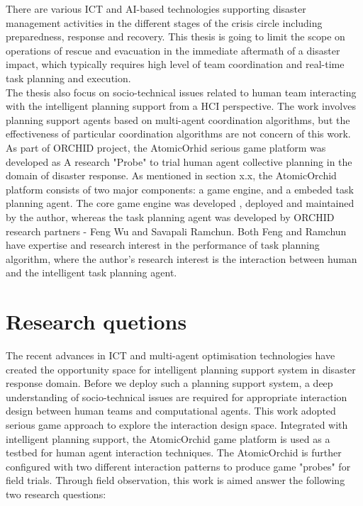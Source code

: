 There are various ICT and AI-based technologies supporting disaster management activities in the different stages of the crisis circle including preparedness, response and recovery. This thesis is going to limit the scope on operations of rescue and evacuation in the immediate aftermath of a disaster impact, which typically requires high level of team coordination and real-time task planning and execution.\\ 

The thesis also focus on socio-technical issues related to human team interacting with the intelligent planning support from a HCI perspective. The work involves planning support agents based on multi-agent coordination algorithms, but the effectiveness of particular coordination algorithms are not concern of this work.\\

As part of ORCHID project, the AtomicOrhid serious game platform was developed as A research "Probe" to trial human agent collective planning in the domain of disaster response. As mentioned in section x.x,  the AtomicOrchid platform consists of two major components: a game engine, and a embeded task planning agent. The core game engine was developed , deployed and maintained by the author, whereas the task planning agent was developed by ORCHID research partners - Feng Wu and Savapali Ramchun. Both Feng and Ramchun have expertise and research interest in the performance of task planning algorithm, where the author's research interest is the interaction between human and the intelligent task planning agent. 

\section{Research quetions}
The recent advances in ICT and multi-agent optimisation technologies have created the opportunity space for intelligent planning support system in disaster response domain. Before we deploy such a planning support system, a deep understanding of socio-technical issues are required for appropriate interaction design between human teams and computational agents. This work adopted serious game approach to explore the interaction design space. Integrated with intelligent planning support, the AtomicOrchid game platform is used as a testbed for human agent interaction techniques.  The AtomicOrchid is further configured with two different interaction patterns to produce game "probes" for field trials. Through field observation, this work is aimed answer the following two research questions:

